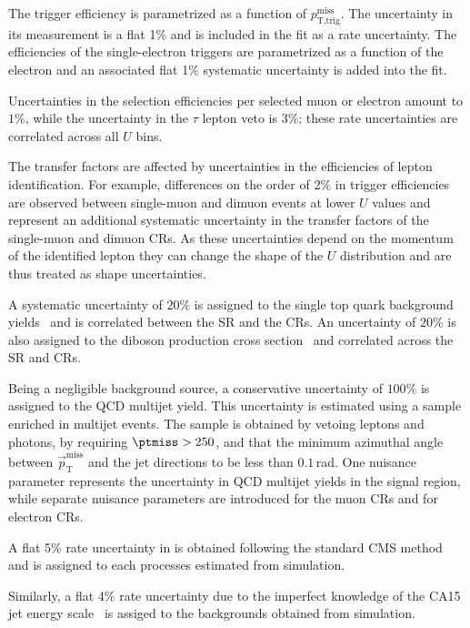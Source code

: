 The \ptmiss trigger efficiency is parametrized as a function of $p_\text{T,trig}^\text{miss}$. The uncertainty in its measurement is a flat 1\% and is included in the fit as a rate uncertainty.
The efficiencies of the single-electron triggers are parametrized as a
function of the electron \pt and an associated flat 1\% systematic uncertainty is added into the fit.

Uncertainties in the selection efficiencies per selected muon or electron amount to $1\%$, while the uncertainty in the $\tau$ lepton veto is $3\%$; these rate uncertainties are correlated across all $U$ bins.

The transfer factors are affected by uncertainties in the efficiencies
of lepton identification.  For example, differences on the order of
2\% in \MET trigger efficiencies are observed between single-muon and
dimuon events at lower $U$ values and represent an additional
systematic uncertainty in the transfer factors of the single-muon and
dimuon CRs. As these uncertainties depend on the momentum of the
identified lepton they can change the shape of the $U$ distribution
and are thus treated as shape uncertainties.

A systematic uncertainty of $20\%$ is assigned to the single top quark background yields~\cite{Chatrchyan:1642680} and is correlated between the SR and the CRs. 
%
An uncertainty of $20\%$ is also assigned to the diboson production cross section~\cite{Khachatryan:2016txa,Khachatryan:2016tgp} and correlated across the SR and CRs.
%

Being a negligible background source, a conservative uncertainty of $100\%$ is assigned to the QCD multijet yield. 
%
This uncertainty is estimated using a sample enriched in multijet events. The sample is obtained by vetoing leptons and photons, by requiring $\ptmiss>250$\GeV, and that the minimum azimuthal angle between $\vec{p}_{\mathrm{T}}^{\mathrm{miss}}$ and the jet directions to be less than $0.1$\,rad.
One nuisance parameter represents the uncertainty in QCD multijet yields in the signal region, while separate nuisance parameters are introduced for the muon CRs and for electron CRs.

A flat 5\% rate uncertainty in \ptmiss is obtained following the standard CMS method~\cite{Khachatryan:2014gga} and is assigned to each processes estimated from simulation.

Similarly, a flat 4\% rate uncertainty due to the imperfect knowledge of the CA15 jet energy scale~\cite{jec} is assiged to the backgrounds obtained from simulation.

